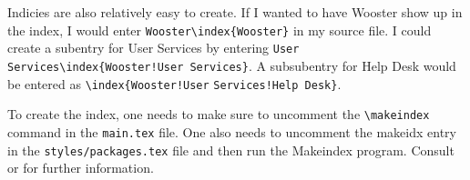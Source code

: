 Indicies are also relatively easy to create. If I wanted to have Wooster show up in the index, I would enter \verb|Wooster\index{Wooster}| in my source file. I could create a subentry for User Services by entering \verb|User Services|\verb|\index{Wooster!User Services}|. A subsubentry for Help Desk would be entered as \verb|\index{Wooster!User| \verb|Services!Help Desk}|.

To create the index, one needs to make sure to uncomment the \verb|\makeindex| command in the \texttt{main.tex} file. One also needs to uncomment the makeidx entry in the \verb|styles/packages.tex| file and then run the Makeindex program. Consult \citet{kd03} or \citet{mgbcr04} for further information.